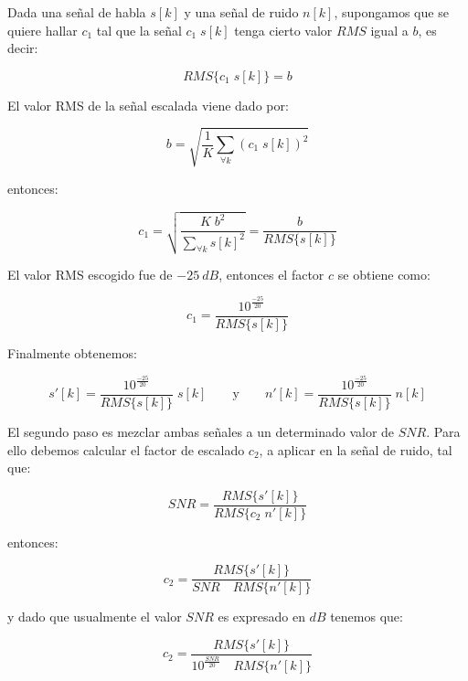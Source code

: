 Dada una señal de habla $s[k]$ y una señal de ruido $n[k]$, supongamos que se quiere hallar $c_1$ tal que la señal $c_1 \; s[k]$ tenga cierto valor $RMS$ igual a $b$, es decir:

\begin{equation*}
	RMS\{c_1 \; s[k]\} = b
\end{equation*}

El valor RMS de la señal escalada viene dado por:

\begin{equation*}
	b = \sqrt{\frac{1}{K} \sum_{\forall k} (c_1 \; s[k])^2}
\end{equation*}

\noindent entonces:

\begin{equation*}
	c_1 = \sqrt{\frac{K \; b^2}{\sum_{\forall k} s[k]^2}} = \frac{b}{RMS\{s[k]\}}
\end{equation*}

El valor RMS escogido fue de $\SI{-25}{dB}$, entonces el factor $c$ se obtiene como:

\begin{equation*}
	c_1 = \frac{10^{\frac{-25}{20}}}{RMS\{s[k]\}}
\end{equation*}

Finalmente obtenemos:

\begin{equation*}
	s'[k] = \frac{10^{\frac{-25}{20}}}{RMS\{s[k]\}} \; s[k] \qquad \text{y} \qquad n'[k] = \frac{10^{\frac{-25}{20}}}{RMS\{s[k]\}} \; n[k]
\end{equation*}

El segundo paso es mezclar ambas señales a un determinado valor de $SNR$. Para ello debemos calcular el factor de escalado $c_2$, a aplicar en la señal de ruido, tal que:

\begin{equation*}
	SNR = \frac{RMS\{s'[k]\}}{RMS\{c_2 \; n'[k]\}}
\end{equation*}

\noindent entonces:

\begin{equation*}
	c_2 = \frac{RMS\{s'[k]\}}{SNR \quad RMS\{n'[k]\}}
\end{equation*}

\noindent y dado que usualmente el valor $SNR$ es expresado en $\si{dB}$ tenemos que:

\begin{equation*}
	c_2 = \frac{RMS\{s'[k]\}}{10^{\frac{SNR}{20}} \quad RMS\{n'[k]\}}
\end{equation*}

